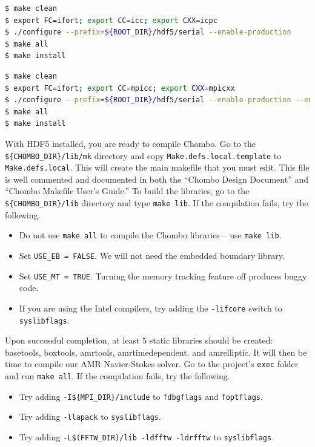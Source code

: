 \documentclass[12pt]{article}
\begin{document}
\begin{lstlisting}[language=sh,caption={Serial HDF5 compilation example.},label=lstHDF5serial]
$ make clean
$ export FC=ifort; export CC=icc; export CXX=icpc
$ ./configure --prefix=${ROOT_DIR}/hdf5/serial --enable-production
$ make all
$ make install
\end{lstlisting}

\begin{lstlisting}[language=sh,caption={Parallel HDF5 compilation example.},label=lstHDF5parallel]
$ make clean
$ export FC=ifort; export CC=mpicc; export CXX=mpicxx
$ ./configure --prefix=${ROOT_DIR}/hdf5/serial --enable-production --enable-parallel
$ make all
$ make install
\end{lstlisting}

With HDF5 installed, you are ready to compile Chombo. Go to the \texttt{\$\{CHOMBO\_DIR\}/lib/mk} directory and copy \texttt{Make.defs.local.template} to \texttt{Make.defs.local}. This will create the main makefile that you must edit. This file is well commented and documented in both the ``Chombo Design Document'' and ``Chombo Makefile User’s Guide.'' To build the libraries, go to the \texttt{\$\{CHOMBO\_DIR\}/lib} directory and type \texttt{make lib}. If the compilation fails, try the following.
\begin{itemize}
  \item {Do not use \texttt{make all} to compile the Chombo libraries -- use \texttt{make lib}.}
  \item {Set \texttt{USE\_EB = FALSE}. We will not need the embedded boundary library.}
  \item {Set \texttt{USE\_MT = TRUE}. Turning the memory tracking feature off produces buggy code.}
  \item {If you are using the Intel compilers, try adding the \texttt{-lifcore} switch to \texttt{syslibflags}.}
\end{itemize}

Upon successful completion, at least 5 static libraries should be created: basetools, boxtools, amrtools, amrtimedependent, and amrelliptic. It will then be time to compile our AMR Navier-Stokes solver. Go to the project's \texttt{exec} folder and run \texttt{make all}. If the compilation fails, try the following.
\begin{itemize}
  \item {Try adding \texttt{-I\$\{MPI\_DIR\}/include} to \texttt{fdbgflags} and \texttt{foptflags}.}
  \item {Try adding \texttt{-llapack} to \texttt{syslibflags}.}
  \item {Try adding \texttt{-L\$(FFTW\_DIR)/lib -ldfftw -ldrfftw} to \texttt{syslibflags}.}
\end{itemize}
\end{document}
